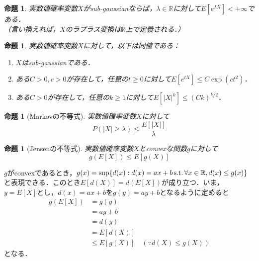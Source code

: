 \documentclass{ltjsarticle}
\makeatletter
\theoremstyle{mystyle1}
\newtheorem{prop}[dfn]{命題}
\theoremstyle{mystyle2}
\theoremstyle{mystyle3}
\renewenvironment{proof}[1][\proofname]{\par
  \pushQED{\qed}%
  \normalfont
  \topsep6\p@\@plus6\p@ \trivlist
  \item[\hskip\labelsep{\bfseries\sffamily #1}]\ignorespaces
}{%
  \popQED\endtrivlist\@endpefalse
}
\renewcommand\proofname{証明}
\makeatother
\begin{document}
\begin{prop}
    実数値確率変数$X$がsub-gaussianならば，$\lambda\in\mathbb{R}$に対して$E[e^{\lambda X}]<+\infty$である．\\（言い換えれば，$X$のラプラス変換は$\mathbb{R}$上で定義される．）
\end{prop}

\begin{prop}
    実数値確率変数$X$に対して，以下は同値である：
    \begin{enumerate}
        \item $X$はsub-gaussianである．
        \item ある$C>0,c>0$が存在して，任意の$t\geq 0$に対して$E[e^{tX}]\leq C\exp(ct^2)$．
        \item ある$C>0$が存在して，任意の$k\geq 1$に対して$E[|X|^k]\leq(Ck)^{k/2}$．
    \end{enumerate}
\end{prop}

\begin{prop}[Markovの不等式]
    実数値確率変数$X$に対して
    \begin{equation}
        P(|X|\geq \lambda)\leq\frac{E[|X|]}{\lambda}
    \end{equation}
\end{prop}

\begin{prop}[Jensenの不等式]
    実数値確率変数$X$とconvexな関数$g$に対して
    \begin{equation}
        g(E[X])\leq E[g(X)]
    \end{equation}
\end{prop}

\begin{proof}
    $g$がconvexであるとき，$g(x)=\sup\{d(x):d(x)=ax+b \textrm{\,s.t.\,}\forall x\in\mathbb{R},d(x)\leq g(x)\}$と表現できる．このとき$E[d(X)]=d(E[X])$が成り立つ．いま，$y=E[X]$とし，$d(x)=ax+b$を$g(y)=ay+b$となるように定めると
    \begin{equation}
        \begin{split}
            g(E[X])
            & =g(y)                                     \\
            & =ay+b                                     \\
            & =d(y)                                     \\
            & =E[d(X)]                                  \\
            & \leq E[g(X)]\quad(\because d(X)\leq g(X))
        \end{split}
    \end{equation}
    となる．
\end{proof}
\end{document}
